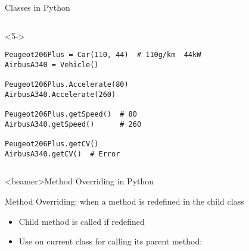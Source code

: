 \begin{frame}[fragile]{Classes in Python}
\begin{columns}[onlytextwidth]
\begin{column}{\textwidth}
      \begin{onlyenv}<5->
        \begin{lstlisting}[style=python]
Peugeot206Plus = Car(110, 44)  # 110g/km  44kW
AirbusA340 = Vehicle()

Peugeot206Plus.Accelerate(80)
AirbusA340.Accelerate(260)

Peugeot206Plus.getSpeed()  # 80
AirbusA340.getSpeed()      # 260

Peugeot206Plus.getCV()
AirbusA340.getCV()  # Error \end{lstlisting}
      \end{onlyenv}

    \end{column}
  \end{columns}

\end{frame}


\begin{frame}<beamer>{Method Overriding in Python}

  Method Overriding: when a method is redefined in the child class

  \vspace*{1cm}

  \begin{itemize}
    \item<2-> Child method is called if redefined
    \item<3-> Use  on current class for calling its parent method: \\
  \end{itemize}

\end{frame}


